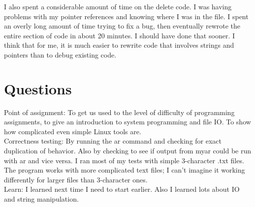 \documentclass[11pt]{article}
\begin{document}
I also spent a considerable amount of time on the delete code. I was having problems with my pointer references and knowing where I was in the file. I spent an overly long amount of time trying to fix a bug, then eventually rewrote the entire section of code in about 20 minutes. I should have done that sooner. I think that for me, it is much easier to rewrite code that involves strings and pointers than to debug existing code. \\

\section{Questions}
Point of assignment: To get us used to the level of difficulty of programming assignments, to give an introduction to system programming and file IO. To show how complicated even simple Linux tools are. \\
Correctness testing: By running the ar command and checking for exact duplication of behavior. Also by checking to see if output from myar could be run with ar and vice versa. I ran most of my tests with simple 3-character .txt files. The program works with more complicated text files; I can't imagine it working differently for larger files than 3-character ones. \\
Learn: I learned next time I need to start earlier. Also I learned lots about IO and string manipulation.\\
\end{document}

